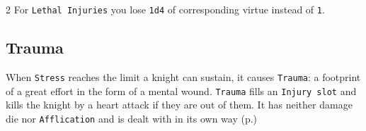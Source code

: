 \begin{multicols*}{2}
For \texttt{Lethal Injuries} you lose \texttt{1d4} of corresponding virtue instead of \texttt{1}.

\subsection*{Trauma} 
When \texttt{Stress} reaches the limit a knight can sustain, it causes \texttt{Trauma}: a footprint of a great effort in the form of a mental wound.
\texttt{Trauma} fills an \texttt{Injury slot} and kills the knight by a heart attack if they are out of them.
It has neither damage die nor \texttt{Afflication} and is dealt with in its own way (p.\pageref*{sec:healing}) 


\end{multicols*}
